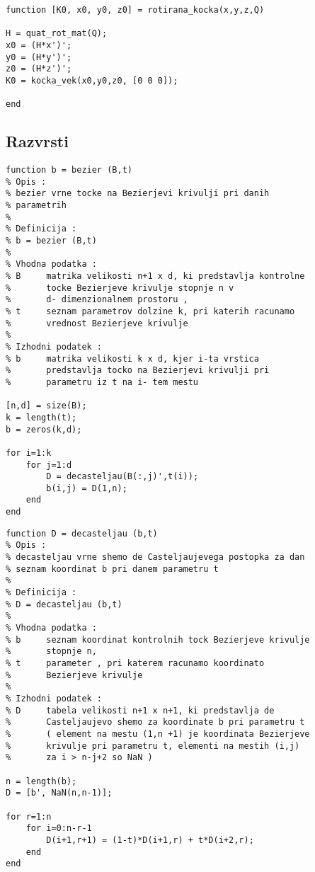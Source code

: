 \documentclass[12pt,a4paper,twoside]{article}
\theoremstyle{definition} %
\theoremstyle{plain} %
\numberwithin{equation}{section}  %
\begin{document}
\begin{lstlisting}[caption = {rotirana\_kocka}]
function [K0, x0, y0, z0] = rotirana_kocka(x,y,z,Q)

H = quat_rot_mat(Q);
x0 = (H*x')';
y0 = (H*y')'; 
z0 = (H*z')';
K0 = kocka_vek(x0,y0,z0, [0 0 0]);

end
\end{lstlisting}

\subsection{Razvrsti}

\begin{lstlisting}[caption = {}]
function b = bezier (B,t)
% Opis :
% bezier vrne tocke na Bezierjevi krivulji pri danih
% parametrih
%
% Definicija :
% b = bezier (B,t)
%
% Vhodna podatka :
% B     matrika velikosti n+1 x d, ki predstavlja kontrolne
%       tocke Bezierjeve krivulje stopnje n v
%       d- dimenzionalnem prostoru ,
% t     seznam parametrov dolzine k, pri katerih racunamo
%       vrednost Bezierjeve krivulje
%
% Izhodni podatek :
% b     matrika velikosti k x d, kjer i-ta vrstica
%       predstavlja tocko na Bezierjevi krivulji pri
%       parametru iz t na i- tem mestu

[n,d] = size(B);
k = length(t);
b = zeros(k,d);

for i=1:k
    for j=1:d
        D = decasteljau(B(:,j)',t(i));
        b(i,j) = D(1,n);
    end
end
\end{lstlisting}


\begin{lstlisting}[caption = {}]
function D = decasteljau (b,t) 
% Opis : 
% decasteljau vrne shemo de Casteljaujevega postopka za dan 
% seznam koordinat b pri danem parametru t 
%
% Definicija : 
% D = decasteljau (b,t) 
%
% Vhodna podatka : 
% b     seznam koordinat kontrolnih tock Bezierjeve krivulje
%       stopnje n,
% t     parameter , pri katerem racunamo koordinato
%       Bezierjeve krivulje
% 
% Izhodni podatek : 
% D     tabela velikosti n+1 x n+1, ki predstavlja de
%       Casteljaujevo shemo za koordinate b pri parametru t
%       ( element na mestu (1,n +1) je koordinata Bezierjeve
%       krivulje pri parametru t, elementi na mestih (i,j)
%       za i > n-j+2 so NaN )

n = length(b);
D = [b', NaN(n,n-1)];

for r=1:n
    for i=0:n-r-1
        D(i+1,r+1) = (1-t)*D(i+1,r) + t*D(i+2,r);
    end
end
\end{lstlisting}
\end{document}
